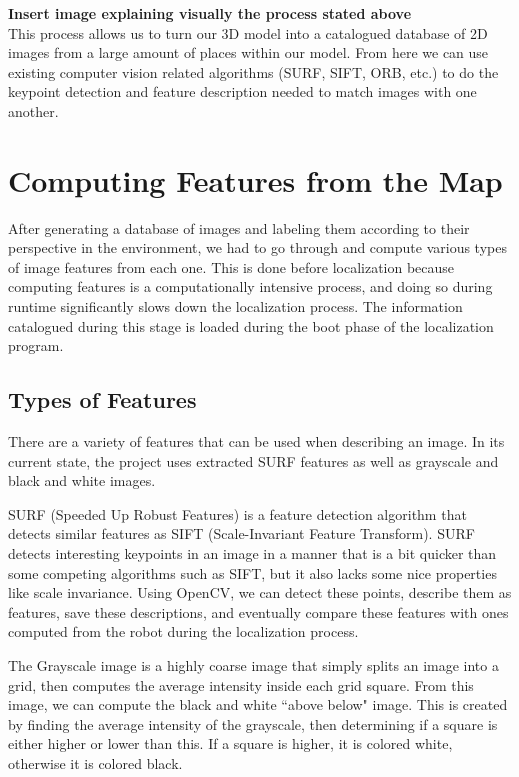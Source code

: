 \documentclass[a4paper,11pt]{article}
\begin{document}
  \textbf{Insert image explaining visually the process stated above} \\

  This process allows us to turn our 3D model into a catalogued database of 2D images from a large amount of places within our model. From here we can use existing computer vision related algorithms (SURF, SIFT, ORB, etc.) to do the keypoint detection and feature description needed to match images with one another.


  \section{Computing Features from the Map}
After generating a database of images and labeling them according to their perspective in the environment, we had to go through and compute various types of image features from each one. This is done before localization because computing features is a computationally intensive process, and doing so during runtime significantly slows down the localization process. The information catalogued during this stage is loaded during the boot phase of the localization program.

  \subsection{Types of Features}
There are a variety of features that can be used when describing an image. In its current state, the project uses extracted SURF features as well as grayscale and black and white images.

SURF (Speeded Up Robust Features) is a feature detection algorithm that detects similar features as SIFT (Scale-Invariant Feature Transform). SURF detects interesting keypoints in an image in a manner that is a bit quicker than some competing algorithms such as SIFT, but it also lacks some nice properties like scale invariance. Using OpenCV, we can detect these points, describe them as features, save these descriptions, and eventually compare these features with ones computed from the robot during the localization process.

The Grayscale image is a highly coarse image that simply splits an image into a grid, then computes the average intensity inside each grid square. From this image, we can compute the black and white ``above below" image. This is created by finding the average intensity of the grayscale, then determining if a square is either higher or lower than this. If a square is higher, it is colored white, otherwise it is colored black.
\end{document}
